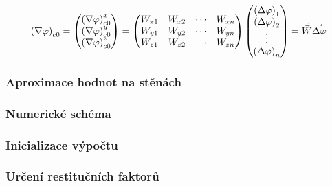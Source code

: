             \begin{equation}
                \left( \nabla \varphi \right) _{c0} = \begin{pmatrix}
                    \left( \nabla \varphi \right) _{c0} ^x \\
                    \left( \nabla \varphi \right) _{c0} ^y \\
                    \left( \nabla \varphi \right) _{c0} ^z 
                \end{pmatrix} = \begin{pmatrix}
                    W_{x1} & W_{x2} & \cdots & W_{xn} \\
                    W_{y1} & W_{y2} & \cdots & W_{yn} \\
                    W_{z1} & W_{z2} & \cdots & W_{zn} 
                \end{pmatrix} \begin{pmatrix}
                    \left( \Delta \varphi \right) _1 \\
                    \left( \Delta \varphi \right) _2 \\
                    \vdots \\
                    \left( \Delta \varphi \right) _n
                \end{pmatrix} = \Vec{\Vec{W}} \Vec{\Delta \varphi}
            \end{equation}
        \subsubsection{Aproximace hodnot na stěnách}
        \subsubsection{Numerické schéma}
        \subsubsection{Inicializace výpočtu}
        \subsubsection{Určení restitučních faktorů}

        
        